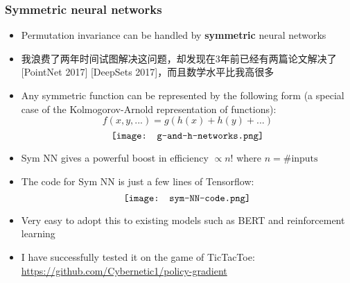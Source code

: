 \documentclass[16pt]{beamer}
\newcommand{\cc}[2]{#1}
\newcommand{\cc}[2]{#2}
\newcommand{\emp}[1]{\textbf{\color{violet}#1}}
\begin{document}
\begin{frame}
\frametitle{Symmetric neural networks}
\begin{itemize}
	\item Permutation invariance can be handled by \emp{symmetric} neural networks

	\item \cc{我浪费了两年时间试图解决这问题，却发现在3年前已经有两篇论文解决了 [PointNet 2017] [DeepSets 2017]，而且数学水平比我高很多
	}
	{I wasted 2 years trying to solve this problem, and then found out it had been solved 3 years before:  [PointNet 2017] and [DeepSets 2017] and their mastery of mathematics is significantly above me!}

	\item Any symmetric function can be represented by the following form (a special case of the Kolmogorov-Arnold representation of functions):
	\begin{equation}
	f(x, y, ...) = g(h(x) + h(y) + ... )
	\end{equation}
	\begin{equation}
	\vcenter{\hbox{\texttt{[image: g-and-h-networks.png]}}}
	\end{equation}
\end{itemize}
\nocite{Qi2017a}
\nocite{Zaheer2017}
\end{frame}

\begin{frame}[plain]
\begin{itemize}
	\item Sym NN gives a powerful boost in efficiency $\propto n!$ where $n = \# \mbox{inputs}$

	\item The code for Sym NN is just a few lines of Tensorflow:
	\begin{equation}
	\vcenter{\hbox{\texttt{[image: sym-NN-code.png]}}}
	\end{equation}
	\item Very easy to adopt this to existing models such as BERT and reinforcement learning
	\item I have successfully tested it on the game of TicTacToe: \\
	\href{https://github.com/Cybernetic1/policy-gradient}{https://github.com/Cybernetic1/policy-gradient}
\end{itemize}
\end{frame}
\end{document}
